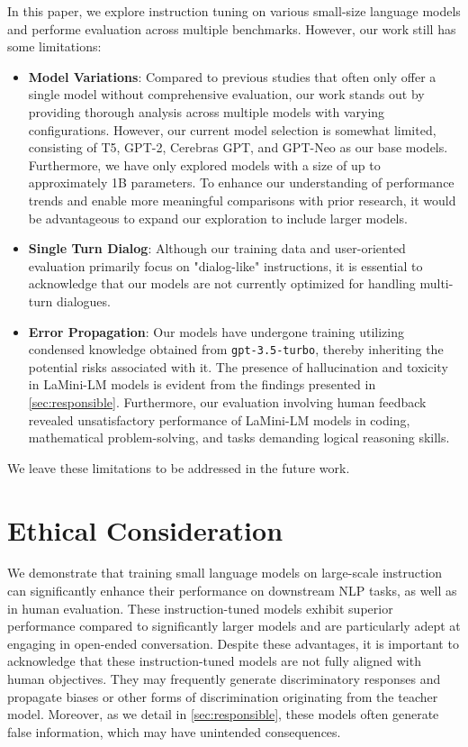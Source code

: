 \documentclass[11pt]{article}
\newcommand{\modelnamefull}{LaMini-LM\xspace}
\newcommand{\llm}[1]{\texttt{#1}\xspace}
\newcommand{\chatgpt}{\llm{gpt-3.5-turbo}}
\begin{document}
In this paper, we explore instruction tuning on various small-size language models and performe evaluation across multiple benchmarks. However, our work still has some limitations:
\begin{itemize}
    \item \textbf{Model Variations}: Compared to previous studies that often only offer a single model without comprehensive evaluation, our work stands out by providing thorough analysis across multiple models with varying configurations. However, our current model selection is somewhat limited, consisting of T5, GPT-2, Cerebras GPT, and GPT-Neo as our base models. Furthermore, we have only explored models with a size of up to approximately 1B parameters. To enhance our understanding of performance trends and enable more meaningful comparisons with prior research, it would be advantageous to expand our exploration to include larger models.

    \item \textbf{Single Turn Dialog}: Although our training data and user-oriented evaluation primarily focus on "dialog-like" instructions, it is essential to acknowledge that our models are not currently optimized for handling multi-turn dialogues.

\item \textbf{Error Propagation}: Our models have undergone training utilizing condensed knowledge obtained from \chatgpt, thereby inheriting the potential risks associated with it. The presence of hallucination and toxicity in \modelnamefull models is evident from the findings presented in \autoref{sec:responsible}. Furthermore, our evaluation involving human feedback revealed unsatisfactory performance of \modelnamefull models in coding, mathematical problem-solving, and tasks demanding logical reasoning skills.
    
\end{itemize}
We leave these limitations to be addressed in the future work.

\section{Ethical Consideration}


We demonstrate that training small language models on large-scale instruction can significantly enhance their performance on downstream NLP tasks, as well as in human evaluation. 
These instruction-tuned models exhibit superior performance compared to significantly larger models and are particularly adept at engaging in open-ended conversation. 
Despite these advantages, it is important to acknowledge that these instruction-tuned models are not fully aligned with human objectives. 
They may frequently generate discriminatory responses and propagate biases or other forms of discrimination originating from the teacher model. 
Moreover, as we detail in \autoref{sec:responsible}, these models often generate false information, which may have unintended consequences.
\end{document}
